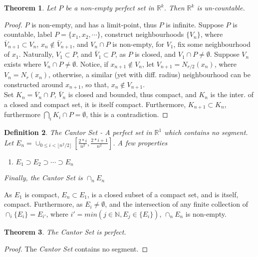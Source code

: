 \documentclass{amsart}
\numberwithin{equation}{section}
\theoremstyle{plain}
\newtheorem{thm}{Theorem}[section]
\newtheorem{dfn}[thm]{Definition}
\theoremstyle{definition}
\begin{document}
\begin{thm}
  Let $P$ be a non-empty \textit{perfect} set in $\mathbb{R}^k$. Then $\mathbb{R}^k$ is \textit{un-countable}.
\end{thm}
\begin{proof} 
  $P$ is non-empty, and has a limit-point, thus $P$ is infinite. Suppose $P$ is countable, label $P = \{x_1, x_2, \cdots \}$, construct
  neighbourhoods $\{V_n\}$, where $\overline{V}_{n+1} \subset V_n$, $x_n \not \in \bar{V}_{n+1}$, and $V_n \cap P$ is non-empty, for $V_1$, fix
  some neighbourhood of $x_1$. Naturally, $V_1 \subset P$, and $\bar{V}_1 \subset P$, as $P$ is closed, and $V_1 \cap P \not= \emptyset$. Suppose $V_n$ exists
  where $V_n \cap P \not= \emptyset$. Notice, if $x_{n+1} \not\in V_n$, let $V_{n+1} = N_{r/2}(x_n)$, where $V_n = N_r(x_n)$, otherwise, 
  a similar (yet with diff. radius) neighbourhood can be constructed around $x_{n+1}$, so that, $x_n \not \in V_{n+1}$. \\
  Set $K_n = \overline{V}_n \cap P$, $\overline{V}_n$ is closed and bounded, thus compact, and
  $K_n$ is the inter. of a closed and compact set, it is itself compact. Furthermore, $K_{n+1} \subset K_n$, furthermore
  $\bigcap_{i} K_i \cap P = \emptyset$, this is a contradiction.
\end{proof}

\begin{dfn}
  \textit{The Cantor Set} - A perfect set in $\mathbb{R}^1$ which contains no segment. Let $E_n = \cup_{0 \leq i < \lfloor n^2/2\rfloor} [\frac{2 * i}{n^2}, \frac{2 * i + 1}{n^2}]$.
  A few properties
  \begin{enumerate}
    \item[(a)] $E_1 \supset E_2 \supset \cdots \supset E_n$\\
  \end{enumerate}
  Finally, the \textit{Cantor Set} is $\cap_{n} E_n$
\end{dfn}
As $E_1$ is compact, $E_n \subset E_1$, is a closed subset of a compact set, and is itself, compact. Furthermore,
as $E_i \not= \emptyset$, and the intersection of any finite collection of $\cap_i \{E_i\} = E_{i'}$, where $i' = min(j \in \mathbb{N}, E_j \in \{E_i\})$, 
$\cap_n E_n$ is non-empty.     

\begin{thm}
  The \textit{Cantor Set} is \textit{perfect}.
\end{thm}
\begin{proof}
  The \textit{Cantor Set} contains no segment.
\end{proof} 
\end{document}
